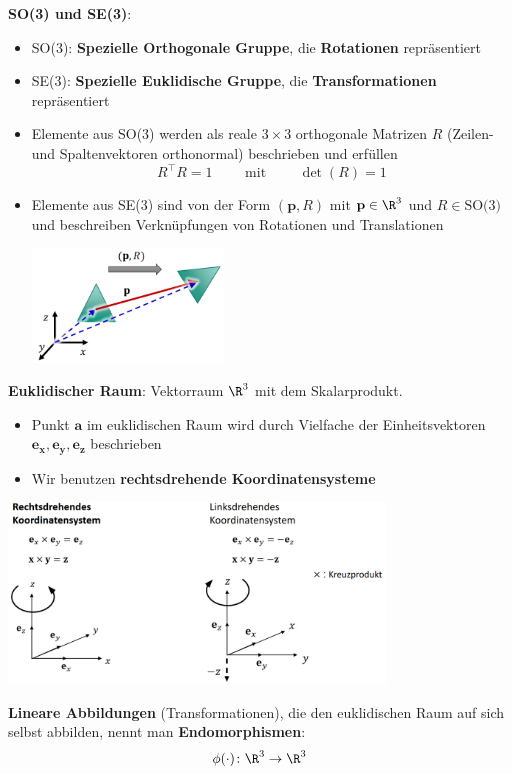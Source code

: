 \textbf{SO(3) und SE(3)}:
\begin{itemize}
	\item SO(3): \textbf{Spezielle Orthogonale Gruppe}, die \textbf{Rotationen} repräsentiert
	\item SE(3): \textbf{Spezielle Euklidische Gruppe}, die \textbf{Transformationen} repräsentiert
	\item Elemente aus SO(3) werden als reale $3\times3$ orthogonale Matrizen $R$ (Zeilen- und Spaltenvektoren orthonormal) beschrieben und erfüllen
	$$R^\top R=1 \qquad \text{ mit } \qquad\det(R)=1$$
	\item Elemente aus SE(3) sind von der Form $(\mathbf{p},R)$ mit $\mathbf{p}\in\R^3$ und $R\in\text{SO(3)}$ und beschreiben Verknüpfungen von Rotationen und Translationen
	\begin{center}
		\includegraphics[width=0.4\textwidth]{images/se3.png}
	\end{center}
\end{itemize}
\medskip
\textbf{Euklidischer Raum}: Vektorraum $\R^3$ mit dem Skalarprodukt.
\begin{itemize}
	\item Punkt $\mathbf{a}$ im euklidischen Raum wird durch Vielfache der Einheitsvektoren $\mathbf{e_x}, \mathbf{e_y}, \mathbf{e_z}$ beschrieben
	\item Wir benutzen \textbf{rechtsdrehende Koordinatensysteme}
\end{itemize}
\begin{center}
	\includegraphics[width=0.75\textwidth]{images/koordinaten.png}
\end{center}
\medskip
\textbf{Lineare Abbildungen}  (Transformationen), die den euklidischen Raum auf sich selbst abbilden, nennt man \textbf{Endomorphismen}: $$\phi(\cdot)\colon\R^3\rightarrow\R^3$$

